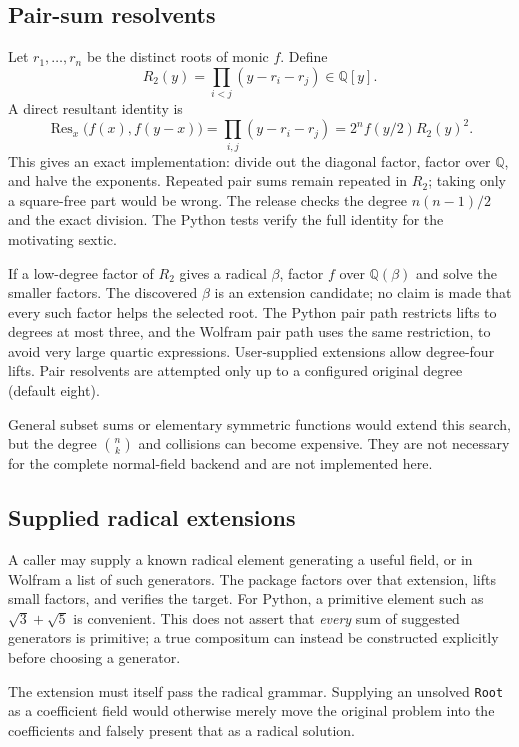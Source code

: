 \documentclass[11pt,a4paper]{article}
\newcommand{\Q}{\mathbb Q}
\DeclareMathOperator{\Res}{Res}
\theoremstyle{definition}
\begin{document}
\subsection{Pair-sum resolvents}
Let $r_1,\ldots,r_n$ be the distinct roots of monic $f$. Define
\[
 R_2(y)=\prod_{i<j}(y-r_i-r_j)\in\Q[y].
\]
A direct resultant identity is
\begin{equation}\label{eq:pairres}
 \Res_x\bigl(f(x),f(y-x)\bigr)
 =\prod_{i,j}(y-r_i-r_j)
 =2^n f(y/2)R_2(y)^2.
\end{equation}
This gives an exact implementation: divide out the diagonal factor, factor over
$\Q$, and halve the exponents. Repeated pair sums remain repeated in $R_2$;
taking only a square-free part would be wrong. The release checks the degree
$n(n-1)/2$ and the exact division. The Python tests verify the full identity
for the motivating sextic.

If a low-degree factor of $R_2$ gives a radical $\beta$, factor $f$ over
$\Q(\beta)$ and solve the smaller factors. The discovered $\beta$ is an extension
candidate; no claim is made that every such factor helps the selected root.
The Python pair path restricts lifts to degrees at most three, and the Wolfram
pair path uses the same restriction, to avoid very large quartic expressions.
User-supplied extensions allow degree-four lifts. Pair resolvents are attempted
only up to a configured original degree (default eight).

General subset sums or elementary symmetric functions would extend this search,
but the degree $\binom nk$ and collisions can become expensive. They are not
necessary for the complete normal-field backend and are not implemented here.

\subsection{Supplied radical extensions}
A caller may supply a known radical element generating a useful field, or in
Wolfram a list of such generators. The package factors over that extension,
lifts small factors, and verifies the target. For Python, a primitive element
such as $\sqrt3+\sqrt5$ is convenient. This does not assert that \emph{every}
sum of suggested generators is primitive; a true compositum can instead be
constructed explicitly before choosing a generator.

The extension must itself pass the radical grammar. Supplying an unsolved
\texttt{Root} as a coefficient field would otherwise merely move the original
problem into the coefficients and falsely present that as a radical solution.
\end{document}

